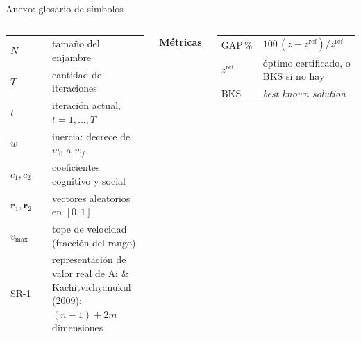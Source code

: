 \documentclass[aspectratio=169, 11pt, xcolor={dvipsnames,table}]{beamer}
\newcommand{\azul}[1]{\textcolor{UsachAzul}{#1}}
\begin{document}
\begin{frame}[noframenumbering]{Anexo: glosario de símbolos}
\begin{columns}[T]
\begin{tabular}{@{}l p{0.70\linewidth}@{}}
$N$ & tamaño del enjambre \\
$T$ & cantidad de iteraciones \\
$t$ & iteración actual, $t=1,\dots,T$ \\
$w$ & inercia: decrece de $w_0$ a $w_f$ \\
$c_1,c_2$ & coeficientes cognitivo y social \\
$\mathbf{r}_1,\mathbf{r}_2$ & vectores aleatorios en $[0,1]$ \\
$v_{\max}$ & tope de velocidad (fracción del rango) \\
SR-1 & representación de valor real de Ai \& Kachitvichyanukul (2009): $(n{-}1)+2m$ dimensiones \\
\bottomrule
\end{tabular}
\par\medskip
\textbf{\azul{Métricas}}\par\smallskip
\begin{tabular}{@{}l p{0.70\linewidth}@{}}
\toprule
GAP\,\% & $100\,(z - z^{\text{ref}})/z^{\text{ref}}$ \\
$z^{\text{ref}}$ & óptimo certificado, o BKS si no hay \\
BKS & \textit{best known solution} \\
\bottomrule
\end{tabular}
\end{columns}
\end{frame}
\end{document}
